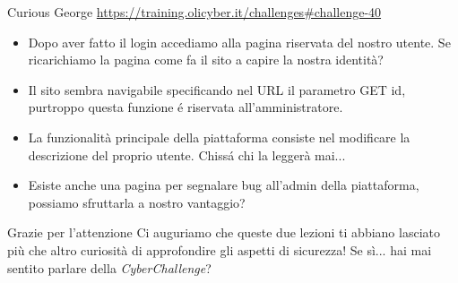 \documentclass[12pt]{beamer}
\begin{document}
\begin{frame}{Curious George}
    \url{https://training.olicyber.it/challenges\#challenge-40}
    \vfill
    \begin{itemize}
        \item Dopo aver fatto il login accediamo alla pagina riservata del nostro utente. Se ricarichiamo la pagina come fa il sito a capire la nostra identità?
        \pause
        \item Il sito sembra navigabile specificando nel URL il parametro GET id, purtroppo questa funzione é riservata all'amministratore.
        \pause
        \item La funzionalità principale della piattaforma consiste nel modificare la descrizione del proprio utente. Chissá chi la leggerà mai...
        \pause
        \item Esiste anche una pagina per segnalare bug all'admin della piattaforma, possiamo sfruttarla a nostro vantaggio?
        \pause
    \end{itemize}
    \vfill
\end{frame}

\begin{frame}{Grazie per l'attenzione}
Ci auguriamo che queste due lezioni ti abbiano lasciato più che altro curiosità di approfondire gli aspetti di sicurezza!
\vfill
Se sì... hai mai sentito parlare della \textit{CyberChallenge}?
\end{frame}
\end{document}
